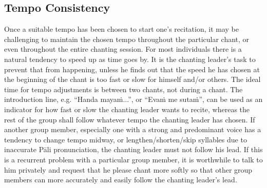 \subsection*{Tempo Consistency}
\begin{justify}
  Once a suitable tempo has been chosen to start one's recitation, it may be challenging to maintain the chosen tempo throughout the particular chant, or even throughout the entire chanting session. For most individuals there is a natural tendency to speed up as time goes by. It is the chanting leader's task to prevent that from happening, unless he finds out that the speed he has chosen at the beginning of the chant is too fast or slow for himself and/or others. The ideal time for tempo adjustments is between two chants, not during a chant. The introduction line, e.g. ``Handa mayaṁ...'', or ``Evaṁ me sutaṁ'', can be used as an indicator for how fast or slow the chanting leader wants to recite, whereas the rest of the group shall follow whatever tempo the chanting leader has chosen. If another group member, especially one with a strong and predominant voice has a tendency to change tempo midway, or lengthen/shorten/skip syllables due to inaccurate Pāli pronunciation, the chanting leader must not follow his lead. If this is a recurrent problem with a particular group member, it is worthwhile to talk to him privately and request that he please chant more softly so that other group members can more accurately and easily follow the chanting leader's lead.
\end{justify}


